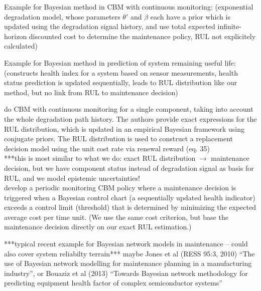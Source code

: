 \documentclass[authoryear]{elsarticle}
\begin{document}
Example for Bayesian method in CBM with continuous monitoring: \cite{2011:elwany-et-al}
(exponential degradation model, whose parameters $\theta'$ and $\beta$ each have a prior
which is updated using the degradation signal history,
and use total expected infinite-horizon discounted cost to determine the maintenance policy,
RUL not explicitely calculated)

Example for Bayesian method in prediction of system remaining useful life: \cite{2012:sun-et-al}
(constructs health index for a system based on sensor measurements,
health status prediction is updated sequentially,
leads to RUL distribution like our method,
but no link from RUL to maintenance decision)

\cite{2013:si-et-al} do CBM with continuous monitoring for a single component,
taking into account the whole degradation path history.
The authors provide exact expressions for the RUL distribution, which is updated in an empirical Bayesian framework using conjugate priors.
The RUL distribution is used to construct a replacement decision model using the unit cost rate via renewal reward
(eq. 35)\\
***this is most similar to what we do: exact RUL distribution $\to$ maintenance decision,
but we have component status instead of degradation signal as basis for RUL,
and we model epistemic uncertainties!\\

\cite{2011:kim-et-al} develop a periodic monitoring CBM policy
where a maintenance decision is triggered when
a Bayesian control chart (a sequentially updated health indicator) %
exceeds a control limit (threshold) that is determined
by minimizing the expected average cost per time unit.
(We use the same cost criterion, but base the maintenance decision directly on our exact RUL estimation.)

***typical recent example for Bayesian network models in maintenance -- could also cover system reliabilty terrain***
maybe Jones et al (RESS 95:3, 2010) ``The use of Bayesian network modelling for maintenance planning in a manufacturing industry'',
or Bouaziz et al (2013) ``Towards Bayesian network methodology for predicting equipment health factor of complex semiconductor systems''
\end{document}
